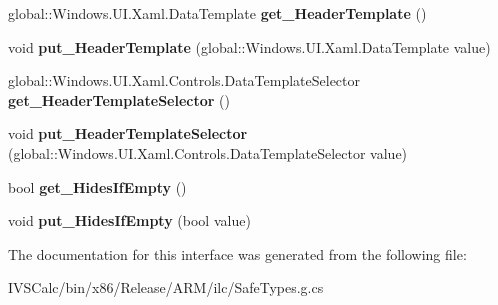 \begin{DoxyCompactItemize}
\item 
\mbox{\label{interface_windows_1_1_u_i_1_1_xaml_1_1_controls_1_1_i_group_style_ae2c73494e7acf4a2194f66515b44cb36}} 
global\+::\+Windows.\+U\+I.\+Xaml.\+Data\+Template {\bfseries get\+\_\+\+Header\+Template} ()
\item 
\mbox{\label{interface_windows_1_1_u_i_1_1_xaml_1_1_controls_1_1_i_group_style_a740a71b8b3a99bb878e9ba66ebae7c4d}} 
void {\bfseries put\+\_\+\+Header\+Template} (global\+::\+Windows.\+U\+I.\+Xaml.\+Data\+Template value)
\item 
\mbox{\label{interface_windows_1_1_u_i_1_1_xaml_1_1_controls_1_1_i_group_style_a28c8a1b47d3dbd9c19e2499b6b78dd6b}} 
global\+::\+Windows.\+U\+I.\+Xaml.\+Controls.\+Data\+Template\+Selector {\bfseries get\+\_\+\+Header\+Template\+Selector} ()
\item 
\mbox{\label{interface_windows_1_1_u_i_1_1_xaml_1_1_controls_1_1_i_group_style_a7afe7db38684a1546bd50fa72f58ec53}} 
void {\bfseries put\+\_\+\+Header\+Template\+Selector} (global\+::\+Windows.\+U\+I.\+Xaml.\+Controls.\+Data\+Template\+Selector value)
\item 
\mbox{\label{interface_windows_1_1_u_i_1_1_xaml_1_1_controls_1_1_i_group_style_a9bc855cd77a4f2a8ba5d4c3e7c7174a9}} 
bool {\bfseries get\+\_\+\+Hides\+If\+Empty} ()
\item 
\mbox{\label{interface_windows_1_1_u_i_1_1_xaml_1_1_controls_1_1_i_group_style_aa1cde0010b3374a26237b4f39bcf3370}} 
void {\bfseries put\+\_\+\+Hides\+If\+Empty} (bool value)
\end{DoxyCompactItemize}


The documentation for this interface was generated from the following file\+:\begin{DoxyCompactItemize}
\item 
I\+V\+S\+Calc/bin/x86/\+Release/\+A\+R\+M/ilc/Safe\+Types.\+g.\+cs\end{DoxyCompactItemize}
